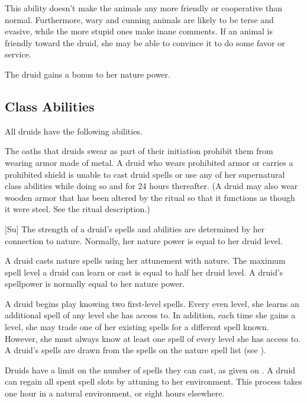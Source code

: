         This ability doesn't make the animals any more friendly or cooperative than normal.
        Furthermore, wary and cunning animals are likely to be terse and evasive, while the more stupid ones make inane comments.
        If an animal is friendly toward the druid, she may be able to convince it to do some favor or service.

        The druid gains a  bonus to her nature power.

    \subsection{Class Abilities}
        All druids have the following abilities.

        The oaths that druids swear as part of their initiation prohibit them from wearing armor made of metal.
        A druid who wears prohibited armor or carries a prohibited shield is unable to cast druid spells or use any of her supernatural class abilities while doing so and for 24 hours thereafter.
        (A druid may also wear wooden armor that has been altered by the  ritual so that it functions as though it were steel. See the ritual description.)

        [Su]
        The strength of a druid's spells and abilities are determined by her connection to nature.
        Normally, her nature power is equal to her druid level.

        A druid casts nature spells using her attunement with nature.
        The maximum spell level a druid can learn or cast is equal to half her druid level.
        A druid's spellpower is normally equal to her nature power.

        A druid begins play knowing two first-level spells.
        Every even level, she learns an additional spell of any level she has access to.
        In addition, each time she gains a level, she may trade one of her existing spells for a different spell known.
        However, she must always know at least one spell of every level she has access to.
        A druid's spells are drawn from the spells on the nature spell list (see ).

        Druids have a limit on the number of spells they can cast, as given on .
        A druid can regain all spent spell slots by attuning to her environment.
        This process takes one hour in a natural environment, or eight hours elsewhere.

